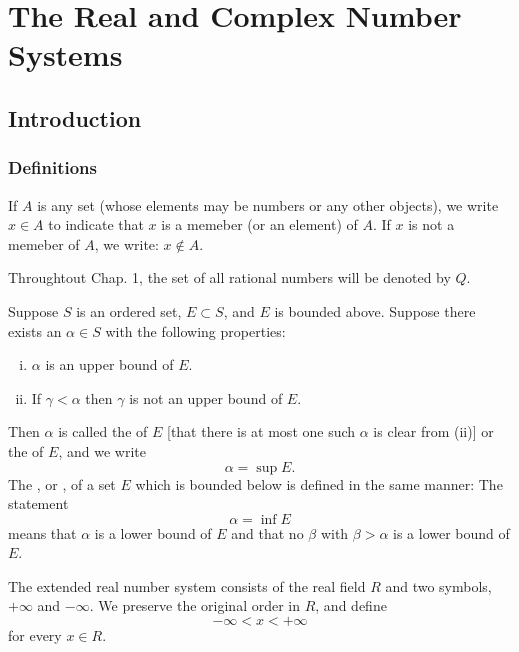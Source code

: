 \chapter{The Real and Complex Number Systems}
\section{Introduction}
\subsection{Definitions}
\begin{definition}
	If $A$ is any set (whose elements may be numbers or any other objects), we write $x \in A$ to indicate that $x$ is a memeber (or an element) of $A$. If $x$ is not a memeber of $A$, we write: $x \notin A$.
\end{definition}

\begin{definition}
	Throughtout Chap. 1, the set of all rational numbers will be denoted by $Q$.
\end{definition}

\begin{definition}\label{def:supinf}
	Suppose $S$ is an ordered set, $E\subset S$, and $E$ is bounded above. Suppose there exists an $\alpha\in S$ with the following properties:
	\begin{enumerate}[(i)]
		\item $\alpha$ is an upper bound of $E$.
		\item If $\gamma <\alpha$ then $\gamma$ is not an upper bound of $E$.
	\end{enumerate}
	Then $\alpha$ is called the {} of $E$ [that there is at most one such $\alpha$ is clear from (ii)] or the {} of $E$, and we write $$\alpha=\sup E.$$ The {}, or {}, of a set $E$ which is bounded below is defined in the same manner: The statement $$\alpha = \inf E$$ means that $\alpha$ is a lower bound of $E$ and that no $\beta$ with $\beta>\alpha$ is a lower bound of $E$.
\end{definition}

\begin{definition}\label{def:infinity}
	The extended real number system consists of the real field $R$ and two symbols, $+\infty$ and $-\infty$. We preserve the original order in $R$, and define $$-\infty<x<+\infty$$ for every $x\in R$.
\end{definition}

